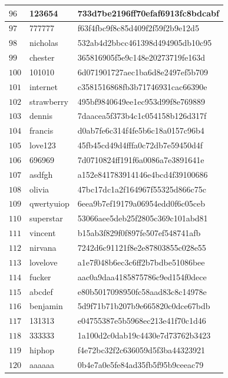 \begin{longtable}{|l|l|l|}
    $96$ & 123654 & 733d7be2196ff70efaf6913fc8bdcabf \\ \hline
    $97$ & 777777 & f63f4fbc9f8c85d409f2f59f2b9e12d5 \\ \hline
    $98$ & nicholas & 532ab4d2bbcc461398d494905db10c95 \\ \hline
    $99$ & chester & 365816905f5e9c148e20273719fe163d \\ \hline
    $100$ & 101010 & 6d071901727aec1ba6d8e2497ef5b709 \\ \hline
    $101$ & internet & c3581516868fb3b71746931cac66390e \\ \hline
    $102$ & strawberry & 495bf9840649ee1ec953d99f8e769889 \\ \hline
    $103$ & dennis & 7daacea5f373b4c1c054158b126d317f \\ \hline
    $104$ & francis & d0ab7fe6c314f4fe5b6c18a0157c96b4 \\ \hline
    $105$ & love123 & 45fb45cd49d4fffa0c72db7e59450d4f \\ \hline
    $106$ & 696969 & 7d0710824ff191f6a0086a7e3891641e \\ \hline
    $107$ & asdfgh & a152e841783914146e4bcd4f39100686 \\ \hline
    $108$ & olivia & 47bc17dc1a2f164967f55325d866c75c \\ \hline
    $109$ & qwertyuiop & 6eea9b7ef19179a06954edd0f6c05ceb \\ \hline
    $110$ & superstar & 53066aee5deb25f2805c369c101abd81 \\ \hline
    $111$ & vincent & b15ab3f829f0f897fe507ef548741afb \\ \hline
    $112$ & nirvana & 7242d6c91121f8e2e87803855c028e55 \\ \hline
    $113$ & lovelove & a1e7f048b6ec3c6ff2b7bdbe51086bee \\ \hline
    $114$ & fucker & aac0a9daa4185875786c9ed154f0dece \\ \hline
    $115$ & abcdef & e80b5017098950fc58aad83c8c14978e \\ \hline
    $116$ & benjamin & 5d9f71b71b207b9e665820c0dce67bdb \\ \hline
    $117$ & 131313 & e04755387e5b5968ec213e41f70c1d46 \\ \hline
    $118$ & 333333 & 1a100d2c0dab19c4430e7d73762b3423 \\ \hline
    $119$ & hiphop & f4e72bc32f2c636059d5f3ba44323921 \\ \hline
    $120$ & aaaaaa & 0b4e7a0e5fe84ad35fb5f95b9ceeac79 \\ \hline

\end{longtable}
